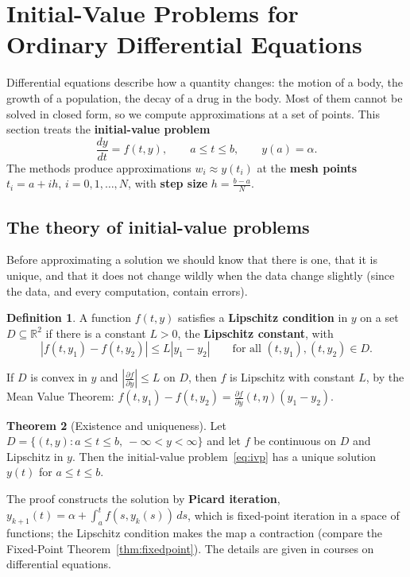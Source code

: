 \documentclass[11pt,a4paper]{article}
\numberwithin{equation}{section}
\theoremstyle{definition}
\newtheorem{thm}{Theorem}[subsection]
\newtheorem{defn}[thm]{Definition}
\begin{document}
\section{Initial-Value Problems for Ordinary Differential Equations}
\label{sec:ivp}

Differential equations describe how a quantity changes: the motion of a body, the growth of a population, the decay of a drug in the
body. Most of them cannot be solved in closed form, so we compute approximations at a set of points. This section treats the
\textbf{initial-value problem}
\begin{equation}\label{eq:ivp}
\frac{dy}{dt} = f(t,y),\qquad a\leq t\leq b,\qquad y(a) = \alpha .
\end{equation}
The methods produce approximations $w_i\approx y(t_i)$ at the \textbf{mesh points} $t_i = a+ih$, $i = 0,1,\dots,N$, with \textbf{step size}
$h = \frac{b-a}{N}$.


\subsection{The theory of initial-value problems}
\label{sec:ivptheory}

Before approximating a solution we should know that there is one, that it is unique, and that it does not change wildly when the data
change slightly (since the data, and every computation, contain errors).

\begin{defn}
A function $f(t,y)$ satisfies a \textbf{Lipschitz condition} in $y$ on a set $D\subseteq\mathbb R^2$ if there is a constant $L>0$, the
\textbf{Lipschitz constant}, with
$$|f(t,y_1)-f(t,y_2)|\leq L|y_1-y_2|\qquad\text{for all }(t,y_1),(t,y_2)\in D .$$
\end{defn}

If $D$ is convex in $y$ and $\left|\frac{\partial f}{\partial y}\right|\leq L$ on $D$, then $f$ is Lipschitz with constant $L$, by the Mean Value Theorem:
$f(t,y_1)-f(t,y_2) = \frac{\partial f}{\partial y}(t,\eta)(y_1-y_2)$.

\begin{thm}[Existence and uniqueness]
\label{thm:picard}
Let $D = \{(t,y): a\leq t\leq b,\ -\infty<y<\infty\}$ and let $f$ be continuous on $D$ and Lipschitz in $y$. Then the initial-value
problem~\eqref{eq:ivp} has a unique solution $y(t)$ for $a\leq t\leq b$.
\end{thm}

The proof constructs the solution by \textbf{Picard iteration}, $y_{k+1}(t) = \alpha+\int_a^tf(s,y_k(s))\,ds$, which is fixed-point iteration in a space of
functions; the Lipschitz condition makes the map a contraction (compare the Fixed-Point Theorem~\ref{thm:fixedpoint}). The details are
given in courses on differential equations.
\end{document}
